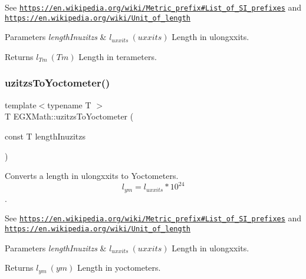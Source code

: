 See \href{https://en.wikipedia.org/wiki/Metric_prefix#List_of_SI_prefixes}{\tt https\+://en.\+wikipedia.\+org/wiki/\+Metric\+\_\+prefix\#\+List\+\_\+of\+\_\+\+S\+I\+\_\+prefixes} and \href{https://en.wikipedia.org/wiki/Unit_of_length}{\tt https\+://en.\+wikipedia.\+org/wiki/\+Unit\+\_\+of\+\_\+length} 
\begin{DoxyParams}{Parameters}
{\em length\+Inuzitzs} & $ l_{uxxits}\ (uxxits)$ Length in ulongxxits. \\
\hline
\end{DoxyParams}
\begin{DoxyReturn}{Returns}
$ l_{Tm}\ (Tm)$ Length in terameters. 
\end{DoxyReturn}
\mbox{\label{group___e_g_x_math-_conversions-_length_conversions-uzitzs-_s_i_gae0faf7639d852bfde8863b3615aa096a}} 
\subsubsection{\texorpdfstring{uzitzs\+To\+Yoctometer()}{uzitzsToYoctometer()}}
{\footnotesize\ttfamily template$<$typename T $>$ \\
T E\+G\+X\+Math\+::uzitzs\+To\+Yoctometer (\begin{DoxyParamCaption}\item[{const T}]{length\+Inuzitzs }\end{DoxyParamCaption})}



Converts a length in ulongxxits to Yoctometers. \[ l_{ym}=l_{uxxits} * 10^{24} \]. 

See \href{https://en.wikipedia.org/wiki/Metric_prefix#List_of_SI_prefixes}{\tt https\+://en.\+wikipedia.\+org/wiki/\+Metric\+\_\+prefix\#\+List\+\_\+of\+\_\+\+S\+I\+\_\+prefixes} and \href{https://en.wikipedia.org/wiki/Unit_of_length}{\tt https\+://en.\+wikipedia.\+org/wiki/\+Unit\+\_\+of\+\_\+length} 
\begin{DoxyParams}{Parameters}
{\em length\+Inuzitzs} & $ l_{uxxits}\ (uxxits)$ Length in ulongxxits. \\
\hline
\end{DoxyParams}
\begin{DoxyReturn}{Returns}
$ l_{ym}\ (ym)$ Length in yoctometers. 
\end{DoxyReturn}
\mbox{\label{group___e_g_x_math-_conversions-_length_conversions-uzitzs-_s_i_gac20be4db1eed0397d7925d5b7148dd94}} 
